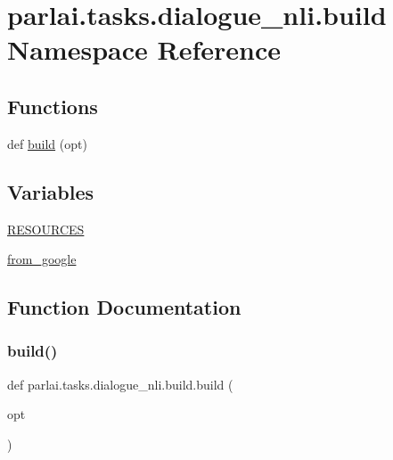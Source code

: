 \hypertarget{namespaceparlai_1_1tasks_1_1dialogue__nli_1_1build}{}\section{parlai.\+tasks.\+dialogue\+\_\+nli.\+build Namespace Reference}
\label{namespaceparlai_1_1tasks_1_1dialogue__nli_1_1build}
\subsection*{Functions}
\begin{DoxyCompactItemize}
\item 
def \hyperlink{namespaceparlai_1_1tasks_1_1dialogue__nli_1_1build_a93644603f76ca94864247f963ba47578}{build} (opt)
\end{DoxyCompactItemize}
\subsection*{Variables}
\begin{DoxyCompactItemize}
\item 
\hyperlink{namespaceparlai_1_1tasks_1_1dialogue__nli_1_1build_af6f5644fe600ed632f1497db4d1a9c0e}{R\+E\+S\+O\+U\+R\+C\+ES}
\item 
\hyperlink{namespaceparlai_1_1tasks_1_1dialogue__nli_1_1build_a61d2bfe776ece7e677e42e59a6113ef9}{from\+\_\+google}
\end{DoxyCompactItemize}


\subsection{Function Documentation}
\mbox{\label{namespaceparlai_1_1tasks_1_1dialogue__nli_1_1build_a93644603f76ca94864247f963ba47578}} 
\subsubsection{\texorpdfstring{build()}{build()}}
{\footnotesize\ttfamily def parlai.\+tasks.\+dialogue\+\_\+nli.\+build.\+build (\begin{DoxyParamCaption}\item[{}]{opt }\end{DoxyParamCaption})}



